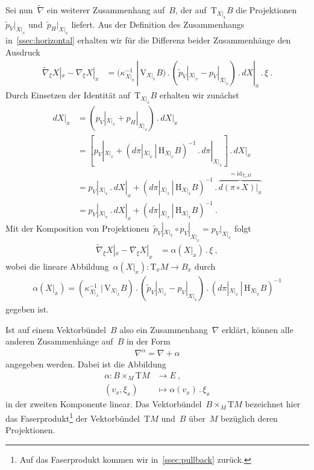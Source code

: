 \documentclass[10pt,a4paper]{article}
\begin{document}
Sei nun~$\tilde{\nabla}$ ein weiterer Zusammenhang auf~$B$, der auf~$\mathrm{T}_{X|_x}B$ die Projektionen~$\tilde{p}_V|_{X|_x}$ und~$\tilde{p}_H|_{X|_x}$ liefert.
Aus der Definition des Zusammenhangs in~\ref{ssec:horizontal} erhalten wir für die Differenz beider Zusammenhänge den Ausdruck
\begin{align*}
\tilde{\nabla}_\xi X|_x - \nabla_\xi X|_x 
&= (\kappa_{X|_x}^{-1}\,|\,\mathrm{V}_{X|_x}B)\,.\,
\left(\tilde{p}_V|_{X|_x} - p_V|_{X|_x}\right)\,.\,
dX|_x
\,.\,\xi
\ .
\end{align*}
Durch Einsetzen der Identität auf~$\mathrm{T}_{X|_x}B$ erhalten wir zunächst
\begin{align*}
dX|_x
&= 
\left(
p_V|_{X|_x} + p_H|_{X|_x}
\right)\,.\,
dX|_x
\nonumber\\
&= 
\left[
p_V|_{X|_x} +
(d\pi|_{X|_x}\,|\, \mathrm{H}_{X|_x}B)^{-1}\,.\,d\pi|_{X|_x}
\right]\,.\,
dX|_x
\nonumber\\
&= p_V|_{X|_x}\,.\,dX|_x
+ (d\pi|_{X|_x}\,|\, \mathrm{H}_{X|_x}B)^{-1}
\,.\,\overset{= \mathrm{id}_{\mathrm{T}_xM}}{\overbrace{d(\pi\circ X)|_x}}
\nonumber\\
&= p_V|_{X|_x}\,.\,dX|_x
+ (d\pi|_{X|_x}\,|\, \mathrm{H}_{X|_x}B)^{-1}
\ .
\end{align*}
Mit der Komposition von Projektionen~$\tilde{p}_V|_{X|_x}\circ p_V|_{X|_x} = p_V|_{X|_x}$  folgt
\begin{align*}
\tilde{\nabla}_\xi X|_x - \nabla_\xi X|_x 
&= \alpha(X|_x)\,.\,\xi
\ ,
\end{align*}
wobei die lineare Abbildung~$\alpha(X|_x):\mathrm{T}_{x}M\rightarrow B_x$ durch
\begin{align*}
\alpha(X|_x) =
(\kappa_{X|_x}^{-1}\,|\,\mathrm{V}_{X|_x}B)\,.\,
\left(\tilde{p}_V|_{X|_x} - p_V|_{X|_x}\right)\,.\,
(d\pi|_{X|_x}\,|\, \mathrm{H}_{X|_x}B)^{-1}
\end{align*}
gegeben ist.

Ist auf einem Vektorbündel~$B$ also ein Zusammenhang~$\nabla$ erklärt, können alle anderen Zusammenhänge auf~$B$ in der Form
\begin{align}
\label{eq:connection_alpha}
\nabla^\alpha = \nabla + \alpha
\end{align}
angegeben werden.
Dabei ist die Abbildung
\begin{align*}
\alpha: B\times_M \mathrm{T}M &\rightarrow E
\ ,\nonumber\\
(v_x, \xi_x) &\mapsto \alpha(v_x)\,.\,\xi_x
\end{align*}
in der zweiten Komponente linear.
Das Vektorbündel~$B\times_M \mathrm{T}M$ bezeichnet hier das Faserprodukt\footnote{Auf das Faserprodukt kommen wir in~\ref{ssec:pullback} zurück.} der Vektorbündel~$\mathrm{T}M$ und~$B$ über~$M$ bezüglich deren Projektionen.
\end{document}
